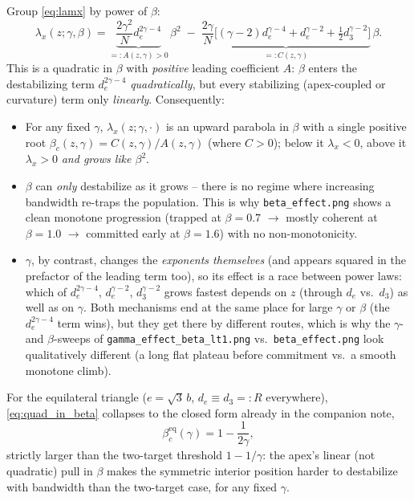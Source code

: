 \documentclass[11pt,a4paper]{article}
\theoremstyle{plain}
\theoremstyle{definition}
\theoremstyle{remark}
\newcommand{\lam}{\lambda}
\newcommand{\bw}{\beta}
\newcommand{\bwc}{\beta_c}
\newcommand{\de}{d_e}
\newcommand{\dth}{d_3}
\begin{document}
Group \eqref{eq:lamx} by power of $\bw$:
\begin{equation}
\lam_x(z;\gamma,\bw)=\underbrace{\frac{2\gamma^2}{N}\de^{2\gamma-4}}_{=:A(z,\gamma)>0}\,\bw^2
\;-\;\underbrace{\frac{2\gamma}{N}\Big[(\gamma-2)\de^{\gamma-4}+\de^{\gamma-2}+\tfrac12\dth^{\gamma-2}\Big]}_{=:C(z,\gamma)}\,\bw.
\label{eq:quad_in_beta}
\end{equation}
This is a quadratic in $\bw$ with \emph{positive} leading coefficient $A$:
$\bw$ enters the destabilizing term $\de^{2\gamma-4}$ \emph{quadratically},
but every stabilizing (apex-coupled or curvature) term only
\emph{linearly}. Consequently:

\begin{itemize}[leftmargin=1.4em]
\item For any fixed $\gamma$, $\lam_x(z;\gamma,\cdot)$ is an upward
parabola in $\bw$ with a single positive root
$\bwc(z,\gamma)=C(z,\gamma)/A(z,\gamma)$ (where $C>0$); below it $\lam_x<0$,
above it $\lam_x>0$ \emph{and grows like $\bw^2$}.
\item $\bw$ can \emph{only} destabilize as it grows -- there is no
regime where increasing bandwidth re-traps the population. This is why
\texttt{beta\_effect.png} shows a clean monotone progression (trapped at
$\bw=0.7$ $\to$ mostly coherent at $\bw=1.0$ $\to$ committed early at
$\bw=1.6$) with no non-monotonicity.
\item $\gamma$, by contrast, changes the \emph{exponents themselves} (and
appears squared in the prefactor of the leading term too), so its effect
is a race between power laws: which of $\de^{2\gamma-4}$, $\de^{\gamma-2}$,
$\dth^{\gamma-2}$ grows fastest depends on $z$ (through $\de$ vs.\ $\dth$)
as well as on $\gamma$. Both mechanisms end at the same place for large
$\gamma$ or $\bw$ (the $\de^{2\gamma-4}$ term wins), but they get there by
different routes, which is why the $\gamma$- and $\bw$-sweeps of
\texttt{gamma\_effect\_beta\_lt1.png} vs.\ \texttt{beta\_effect.png} look
qualitatively different (a long flat plateau before commitment vs.\ a
smooth monotone climb).
\end{itemize}

For the equilateral triangle ($e=\sqrt3\,b$, $\de\equiv\dth=:R$
everywhere), \eqref{eq:quad_in_beta} collapses to the closed form already
in the companion note,
\begin{equation}
\bwc^{\mathrm{eq}}(\gamma)=1-\frac{1}{2\gamma},
\label{eq:bwc_eq}
\end{equation}
strictly larger than the two-target threshold $1-1/\gamma$: the apex's
linear (not quadratic) pull in $\bw$ makes the symmetric interior position
harder to destabilize with bandwidth than the two-target case, for any
fixed $\gamma$.
\end{document}
